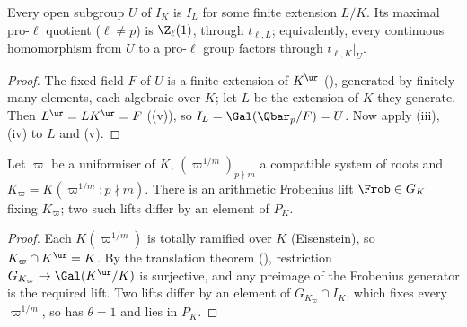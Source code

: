 \begin{corollary}\label{cor:local:open-inertia}
Every open subgroup $U$ of $I_K$ is $I_L$ for some finite extension $L/K$. Its maximal pro-$\ell$ quotient ($\ell\ne p$) is $\Z_\ell(1)$, through
$t_{\ell,L}$; equivalently, every continuous homomorphism from $U$ to a pro-$\ell$ group factors through $t_{\ell,K}|_U$.
\end{corollary}

\begin{proof}
The fixed field $F$ of $U$ is a finite extension of $K^{\ur}$ (), generated by finitely many elements, each algebraic over $K$; let $L$
be the extension of $K$ they generate. Then $L^{\ur}=LK^{\ur}=F$ ((v)), so $I_L=\Gal(\Qbar_p/F)=U$. Now apply
(iii), (iv) to $L$ and (v).
\end{proof}

\begin{corollary}\label{cor:local:frob-fixing-roots}
Let $\varpi$ be a uniformiser of $K$, $(\varpi^{1/m})_{p\nmid m}$ a compatible system of roots and $K_\varpi=K(\varpi^{1/m}:p\nmid m)$. There is an arithmetic
Frobenius lift $\Frob\in G_K$ fixing $K_\varpi$; two such lifts differ by an element of $P_K$.
\end{corollary}

\begin{proof}
Each $K(\varpi^{1/m})$ is totally ramified over $K$ (Eisenstein), so $K_\varpi\cap K^{\ur}=K$. By the translation theorem (), restriction
$G_{K_\varpi}\to\Gal(K^{\ur}/K)$ is surjective, and any preimage of the Frobenius generator is the required lift. Two lifts differ by an element of
$G_{K_\varpi}\cap I_K$, which fixes every $\varpi^{1/m}$, so has $\theta=1$ and lies in $P_K$.
\end{proof}

